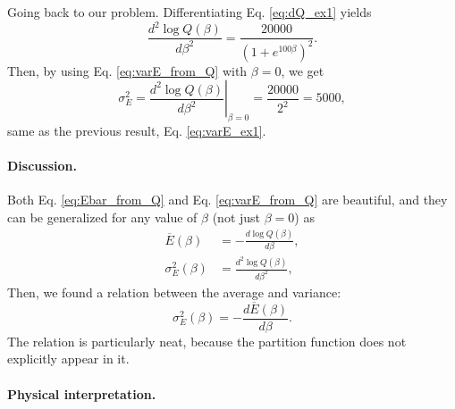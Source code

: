 \documentclass{article}
\begin{document}
Going back to our problem.
Differentiating Eq. \eqref{eq:dQ_ex1} yields
$$
\frac{ d^2 \log Q(\beta) } { d\beta^2 }
=
\frac{ 20000 } { (1 + e^{100 \beta})^2 }
.
$$
Then, by using Eq. \eqref{eq:varE_from_Q} with $\beta = 0$,
we get
$$
  \sigma_E^2
  =
  \left.
  \frac{ d^2 \log Q(\beta) } { d \beta^2 }
  \right|_{\beta = 0}
  =
  \frac{ 20000 } { 2^2 } = 5000,
$$
same as the previous result, Eq. \eqref{eq:varE_ex1}.

\paragraph{Discussion.}


Both Eq. \eqref{eq:Ebar_from_Q} and Eq. \eqref{eq:varE_from_Q}
are beautiful, and they can be generalized for any value of
$\beta$ (not just $\beta = 0$) as
%
\begin{align}
  \overline E(\beta)
  &= - \frac{ d \log Q(\beta) } { d\beta }
  ,
  \label{eq:Ebar_from_logQ}
  \\
  \sigma_E^2(\beta)
  &= \frac{ d^2 \log Q(\beta) } { d\beta^2 }
  ,
  \label{eq:varE_from_logQ}
\end{align}
%
Then, we found a relation between the average and variance:
\begin{equation}
  \sigma_E^2(\beta)
  =
  -
  \frac{ d \overline E(\beta) } { d\beta }
  .
  \label{eq:varE_from_Ebar}
\end{equation}
The relation is particularly neat,
because the partition function
does not explicitly appear in it.




\paragraph{Physical interpretation.}
\end{document}
